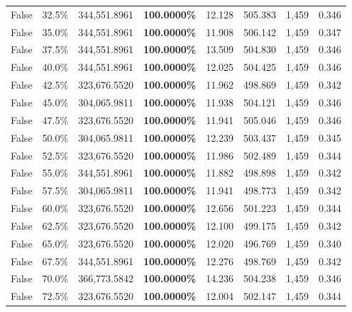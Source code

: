\begin{table}[H]
\begin{tabular}{lllrllll}
\cline{1-8}
False & 32.5\% & 344,551.8961 & \bfseries \color{red} 100.0000\% & 12.128 & 505.383 & 1,459 & 0.346 \\
\cline{1-8}
False & 35.0\% & 344,551.8961 & \bfseries \color{red} 100.0000\% & 11.908 & 506.142 & 1,459 & 0.347 \\
\cline{1-8}
False & 37.5\% & 344,551.8961 & \bfseries \color{red} 100.0000\% & 13.509 & 504.830 & 1,459 & 0.346 \\
\cline{1-8}
False & 40.0\% & 344,551.8961 & \bfseries \color{red} 100.0000\% & 12.025 & 504.425 & 1,459 & 0.346 \\
\cline{1-8}
False & 42.5\% & 323,676.5520 & \bfseries \color{red} 100.0000\% & 11.962 & 498.869 & 1,459 & 0.342 \\
\cline{1-8}
False & 45.0\% & \color{red} 304,065.9811 & \bfseries \color{red} 100.0000\% & 11.938 & 504.121 & 1,459 & 0.346 \\
\cline{1-8}
False & 47.5\% & 323,676.5520 & \bfseries \color{red} 100.0000\% & 11.941 & 505.046 & 1,459 & 0.346 \\
\cline{1-8}
False & 50.0\% & \color{red} 304,065.9811 & \bfseries \color{red} 100.0000\% & 12.239 & 503.437 & 1,459 & 0.345 \\
\cline{1-8}
False & 52.5\% & 323,676.5520 & \bfseries \color{red} 100.0000\% & 11.986 & 502.489 & 1,459 & 0.344 \\
\cline{1-8}
False & 55.0\% & 344,551.8961 & \bfseries \color{red} 100.0000\% & 11.882 & 498.898 & 1,459 & 0.342 \\
\cline{1-8}
False & 57.5\% & \color{red} 304,065.9811 & \bfseries \color{red} 100.0000\% & 11.941 & 498.773 & 1,459 & 0.342 \\
\cline{1-8}
False & 60.0\% & 323,676.5520 & \bfseries \color{red} 100.0000\% & 12.656 & 501.223 & 1,459 & 0.344 \\
\cline{1-8}
False & 62.5\% & 323,676.5520 & \bfseries \color{red} 100.0000\% & 12.100 & 499.175 & 1,459 & 0.342 \\
\cline{1-8}
False & 65.0\% & 323,676.5520 & \bfseries \color{red} 100.0000\% & 12.020 & 496.769 & 1,459 & 0.340 \\
\cline{1-8}
False & 67.5\% & 344,551.8961 & \bfseries \color{red} 100.0000\% & 12.276 & 498.769 & 1,459 & 0.342 \\
\cline{1-8}
False & 70.0\% & 366,773.5842 & \bfseries \color{red} 100.0000\% & 14.236 & 504.238 & 1,459 & 0.346 \\
\cline{1-8}
False & 72.5\% & 323,676.5520 & \bfseries \color{red} 100.0000\% & 12.004 & 502.147 & 1,459 & 0.344 \\

\end{tabular}
\end{table}
